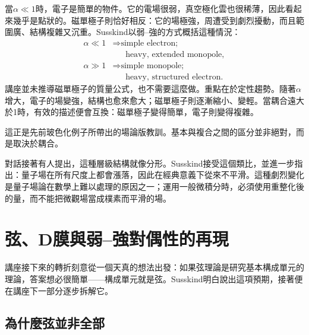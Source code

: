 當\(\alpha\ll 1\)時，電子是簡單的物件。它的電場很弱，真空極化雲也很稀薄，因此看起來幾乎是點狀的。磁單極子則恰好相反：它的場極強，周遭受到劇烈擾動，而且範圍廣、結構複雜又沉重。Susskind以弱--強的方式概括這種情況：
\begin{equation}
\begin{aligned}
\alpha \ll 1
&\Rightarrow \text{simple electron;}\\
&\phantom{\Rightarrow{}}\text{heavy, extended monopole},\\
\alpha \gg 1
&\Rightarrow \text{simple monopole;}\\
&\phantom{\Rightarrow{}}\text{heavy, structured electron}.
\end{aligned}
\end{equation}
講座並未推導磁單極子的質量公式，也不需要這麼做。重點在於定性趨勢。隨著\(\alpha\)增大，電子的場變強，結構也愈來愈大；磁單極子則逐漸縮小、變輕。當耦合遠大於1時，有效的描述便會互換：磁單極子變得簡單，電子則變得複雜。

這正是先前玻色化例子所帶出的場論版教訓。基本與複合之間的區分並非絕對，而是取決於耦合。

\begin{classroomqa}
\end{classroomqa}

對話接著有人提出，這種層級結構就像分形。Susskind接受這個類比，並進一步指出：量子場在所有尺度上都會漲落，因此在經典意義下從來不平滑。這種劇烈變化是量子場論在數學上難以處理的原因之一；運用一般微積分時，必須使用重整化後的量，而不能把微觀場當成樸素而平滑的場。

\section{弦、D膜與弱--強對偶性的再現}

講座接下來的轉折刻意從一個天真的想法出發：如果弦理論是研究基本構成單元的理論，答案想必很簡單——構成單元就是弦。Susskind明白說出這項預期，接著便在講座下一部分逐步拆解它。

\subsection{為什麼弦並非全部}

